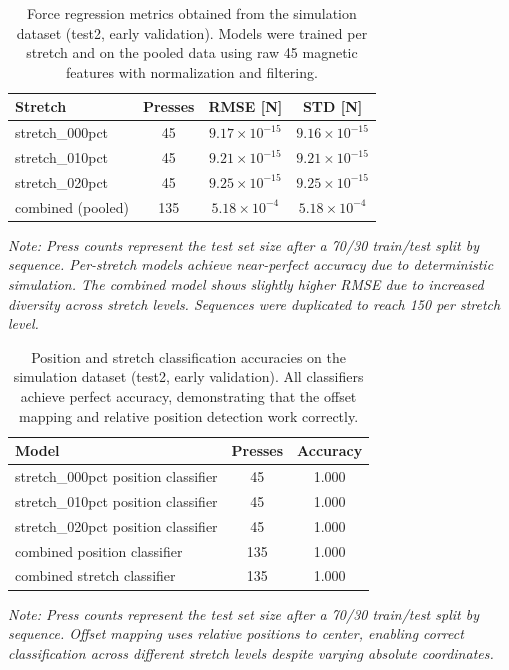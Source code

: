 \documentclass[11pt,a4paper]{article}
\begin{document}
\begin{table}[H]
    \centering
    \caption{Force regression metrics obtained from the simulation dataset (test2, early validation). Models were trained per stretch
             and on the pooled data using raw 45 magnetic features with normalization and filtering.}
    \label{tab:sim-force}
    \begin{tabular}{@{}lccc@{}}
        \toprule
        Stretch & Presses & RMSE [N] & STD [N] \\
        \midrule
        stretch\_000pct & 45 & $9.17 \times 10^{-15}$ & $9.16 \times 10^{-15}$ \\
        stretch\_010pct & 45 & $9.21 \times 10^{-15}$ & $9.21 \times 10^{-15}$ \\
        stretch\_020pct & 45 & $9.25 \times 10^{-15}$ & $9.25 \times 10^{-15}$ \\
        combined (pooled) & 135 & $5.18 \times 10^{-4}$ & $5.18 \times 10^{-4}$ \\
        \bottomrule
    \end{tabular}
    \vspace{0.1cm}
    \footnotesize
    \textit{Note: Press counts represent the test set size after a 70/30 train/test split by sequence. Per-stretch models achieve near-perfect accuracy due to deterministic simulation. The combined model shows slightly higher RMSE due to increased diversity across stretch levels. Sequences were duplicated to reach 150 per stretch level.}
\end{table}

\begin{table}[H]
    \centering
    \caption{Position and stretch classification accuracies on the simulation dataset (test2, early validation). All classifiers
             achieve perfect accuracy, demonstrating that the offset mapping and relative position detection work correctly.}
    \label{tab:sim-offset}
    \begin{tabular}{@{}lcc@{}}
        \toprule
        Model & Presses & Accuracy \\
        \midrule
        stretch\_000pct position classifier & 45 & 1.000 \\
        stretch\_010pct position classifier & 45 & 1.000 \\
        stretch\_020pct position classifier & 45 & 1.000 \\
        combined position classifier & 135 & 1.000 \\
        combined stretch classifier & 135 & 1.000 \\
        \bottomrule
    \end{tabular}
    \vspace{0.1cm}
    \footnotesize
    \textit{Note: Press counts represent the test set size after a 70/30 train/test split by sequence. Offset mapping uses relative positions to center, enabling correct classification across different stretch levels despite varying absolute coordinates.}
\end{table}
\end{document}
